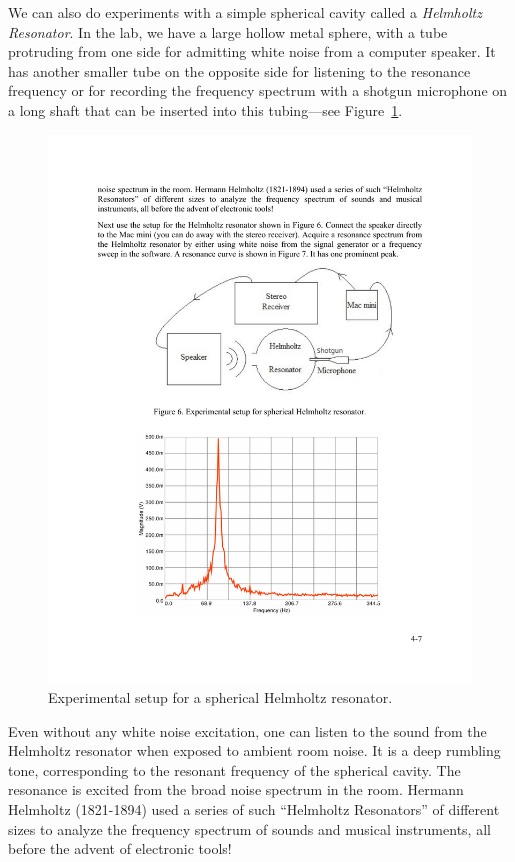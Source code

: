 \documentclass[11pt]{NSF}
\begin{document}
We can also do experiments with a simple spherical cavity 
called a {\em Helmholtz Resonator}. 
In the lab, 
we have a large hollow metal sphere, with a tube protruding 
from one side for admitting white noise from a computer speaker. 
It has another smaller tube on the opposite side for 
listening to the resonance frequency or for recording the 
frequency spectrum with a shotgun microphone on a long shaft 
that can be inserted into this tubing---see Figure~\ref{f:6}.
%
\begin{figure}[hbtp]
\begin{center}
\includegraphics[width=.65\textwidth]{fig4_6}
\caption{Experimental setup for a spherical Helmholtz resonator.}
\label{f:6} 
\end{center} 
\end{figure}
%

Even without any white noise excitation, one can listen to 
the sound from the Helmholtz resonator when exposed to ambient 
room noise.
It is a deep rumbling tone, corresponding to the resonant 
frequency of the spherical cavity. 
The resonance is excited from the broad noise spectrum in the room. 
Hermann Helmholtz (1821-1894) used a series of such 
``Helmholtz Resonators” of different sizes to analyze the 
frequency spectrum of sounds and musical instruments, 
all before the advent of electronic tools!
\end{document}
